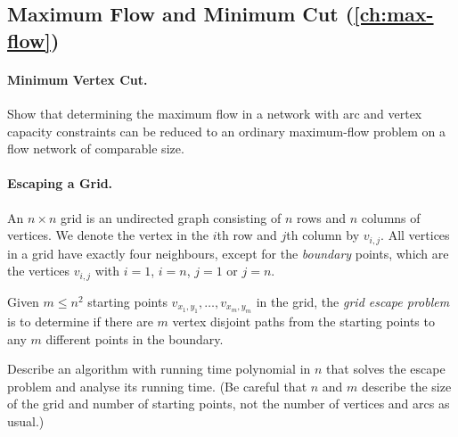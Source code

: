 \subsection*{Maximum Flow and Minimum Cut (\cref{ch:max-flow})}

\paragraph{Minimum Vertex Cut.}
Show that determining the maximum flow in a network with arc and vertex capacity
constraints can be reduced to an ordinary maximum-flow problem on a flow network
of comparable size.

\paragraph{Escaping a Grid.}
An $n \times n$ grid is an undirected graph consisting of $n$ rows and $n$
columns of vertices. We denote the vertex in the $i$th row and $j$th column by
$v_{i,j}$. All vertices in a grid have exactly four neighbours, except for the
\emph{boundary} points, which are the vertices $v_{i,j}$ with $i = 1$, $i = n$,
$j = 1$ or $j = n$.

Given $m \le n^2$ starting points $v_{x_1,y_1}, \ldots, v_{x_m,y_m}$ in the
grid, the \emph{grid escape problem} is to determine if there are $m$
vertex disjoint paths from the starting points to any $m$ different points in
the boundary.

Describe an algorithm with running time polynomial in $n$ that solves the escape
problem and analyse its running time. (Be careful that $n$ and $m$ describe the
size of the grid and number of starting points, not the number of vertices and
arcs as usual.)

